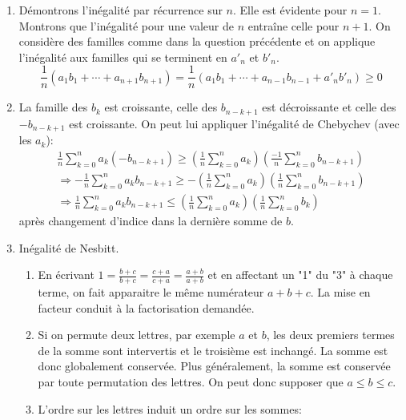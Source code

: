 \begin{enumerate}
 \item Démontrons l'inégalité par récurrence sur $n$. Elle est évidente pour $n=1$. Montrons que l'inégalité pour une valeur de $n$ entraîne celle pour $n+1$.\newline
On considère des familles comme dans la question précédente et on applique l'inégalité aux familles qui se terminent en $a'_n$ et $b'_n$.
\begin{displaymath}
 \frac{1}{n}\left(a_1b_1+\cdots+a_{n+1}b_{n+1} \right)
=  \frac{1}{n}\left(a_1b_1+\cdots+a_{n-1}b_{n-1}+a'_nb'_n \right)\geq 0
\end{displaymath}
  
 \item La famille des $b_k$ est croissante, celle des $b_{n-k+1}$ est décroissante et celle des $-b_{n-k+1}$ est croissante. On peut lui appliquer l'inégalité de Chebychev (avec les $a_k$):
\begin{multline*}
 \frac{1}{n}\sum_{k=0}^na_k(-b_{n-k+1}) \geq \left(\frac{1}{n}\sum_{k=0}^na_k\right)
                                             \left(\frac{-1}{n}\sum_{k=0}^nb_{n-k+1}\right) \\
\Rightarrow
 -\frac{1}{n}\sum_{k=0}^na_kb_{n-k+1} \geq -\left(\frac{1}{n}\sum_{k=0}^na_k\right)
                                             \left(\frac{1}{n}\sum_{k=0}^nb_{n-k+1}\right) \\
\Rightarrow
\frac{1}{n}\sum_{k=0}^na_kb_{n-k+1} \leq \left(\frac{1}{n}\sum_{k=0}^na_k\right)
                                             \left(\frac{1}{n}\sum_{k=0}^nb_{k}\right) 
\end{multline*}
après changement d'indice dans la dernière somme de $b$.
 \item Inégalité de Nesbitt.
\begin{enumerate}
 \item En écrivant $1=\frac{b+c}{b+c}=\frac{c+a}{c+a}=\frac{a+b}{a+b}$ et en affectant un "1" du "3" à chaque terme, on fait apparaitre le même numérateur $a+b+c$. La mise en facteur conduit à la factorisation demandée.
 \item Si on permute deux lettres, par exemple $a$ et $b$, les deux premiers termes de la somme sont intervertis et le troisième est inchangé. La somme est donc globalement conservée. Plus généralement, la somme est conservée par toute permutation des lettres. On peut donc supposer que $a\leq b \leq c$.
 \item L'ordre sur les lettres induit un ordre sur les sommes:
\begin{displaymath}

\end{displaymath}
\end{enumerate}
\end{enumerate}
